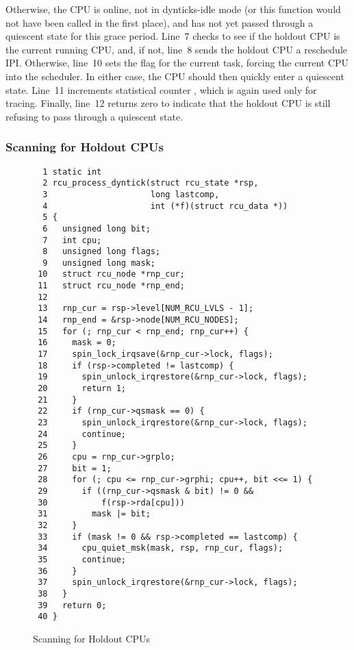Otherwise, the CPU is online, not in dynticks-idle mode (or this
function would not have been called in the first place), and has
not yet passed through a quiescent state for this grace period.
Line~7 checks to see if the holdout CPU is the current running
CPU, and, if not, line~8 sends the holdout CPU a reschedule IPI.
Otherwise, line~10 sets the  flag for the
current task, forcing the current CPU into the scheduler.
In either case, the CPU should then quickly enter a quiescent
state.
Line~11 increments statistical counter , which is
again used only for tracing.
Finally, line~12 returns zero to indicate that the holdout CPU is
still refusing to pass through a quiescent state.

\subsubsection{Scanning for Holdout CPUs}
\label{app:rcuimpl:rcutreewt:Scanning for Holdout CPUs}

\begin{figure}[tbp]
{ \scriptsize
\begin{verbatim}
  1 static int
  2 rcu_process_dyntick(struct rcu_state *rsp,
  3                     long lastcomp,
  4                     int (*f)(struct rcu_data *))
  5 {
  6   unsigned long bit;
  7   int cpu;
  8   unsigned long flags;
  9   unsigned long mask;
 10   struct rcu_node *rnp_cur;
 11   struct rcu_node *rnp_end;
 12
 13   rnp_cur = rsp->level[NUM_RCU_LVLS - 1];
 14   rnp_end = &rsp->node[NUM_RCU_NODES];
 15   for (; rnp_cur < rnp_end; rnp_cur++) {
 16     mask = 0;
 17     spin_lock_irqsave(&rnp_cur->lock, flags);
 18     if (rsp->completed != lastcomp) {
 19       spin_unlock_irqrestore(&rnp_cur->lock, flags);
 20       return 1;
 21     }
 22     if (rnp_cur->qsmask == 0) {
 23       spin_unlock_irqrestore(&rnp_cur->lock, flags);
 24       continue;
 25     }
 26     cpu = rnp_cur->grplo;
 27     bit = 1;
 28     for (; cpu <= rnp_cur->grphi; cpu++, bit <<= 1) {
 29       if ((rnp_cur->qsmask & bit) != 0 &&
 30           f(rsp->rda[cpu]))
 31         mask |= bit;
 32     }
 33     if (mask != 0 && rsp->completed == lastcomp) {
 34       cpu_quiet_msk(mask, rsp, rnp_cur, flags);
 35       continue;
 36     }
 37     spin_unlock_irqrestore(&rnp_cur->lock, flags);
 38   }
 39   return 0;
 40 }
\end{verbatim}
}
\caption{Scanning for Holdout CPUs}
\label{fig:app:rcuimpl:rcutreewt:Scanning for Holdout CPUs}
\end{figure}

